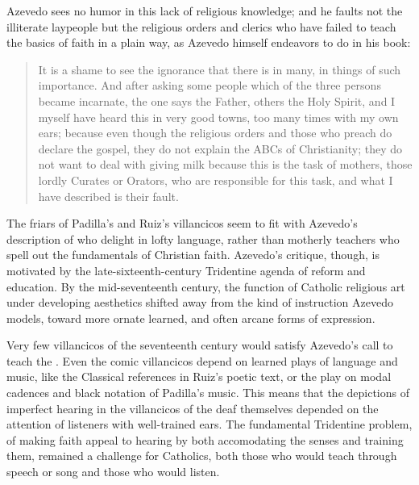 Azevedo sees no humor in this lack of religious knowledge; and he faults not the illiterate laypeople but the religious orders and clerics who have failed to teach the basics of faith in a plain way, as Azevedo himself endeavors to do in his book:
\begin{quote}
It is a shame to see the ignorance that there is in many, in things of such importance.
And after asking some people which of the three persons became incarnate, the one says the Father, others the Holy Spirit, and I myself have heard this in very good towns, too many times with my own ears;
because even though the religious orders and those who preach do declare the gospel, 
they do not explain the ABCs  of Christianity;
they do not want to deal with giving milk because this is the task of mothers, those lordly Curates or Orators, who are responsible for this task, and what I have described is their fault.%
  \begin{Footnote}
  \Autocite[27]{Azevedo:Catecismo}
  \end{Footnote}
\end{quote}

The friars of Padilla's and Ruiz's villancicos seem to fit with Azevedo's description of  who delight in lofty language, rather than motherly teachers who spell out the fundamentals of Christian faith.
Azevedo's critique, though, is motivated by the late-sixteenth-century Tridentine agenda of reform and education.
By the mid-seventeenth century, the function of Catholic religious art under developing  aesthetics shifted away from the kind of  instruction Azevedo models, toward more ornate learned, and often arcane forms of expression.

Very few villancicos of the seventeenth century would satisfy Azevedo's call to teach the .
Even the comic villancicos depend on learned plays of language and music, like the Classical references in Ruiz's poetic text, or the play on modal cadences and black notation of Padilla's music.
This means that the depictions of imperfect hearing in the villancicos of the deaf themselves depended on the attention of listeners with well-trained ears.
The fundamental Tridentine problem, of making faith appeal to hearing by both accomodating the senses and training them, remained a challenge for Catholics, both those who would teach through speech or song and those who would listen.

